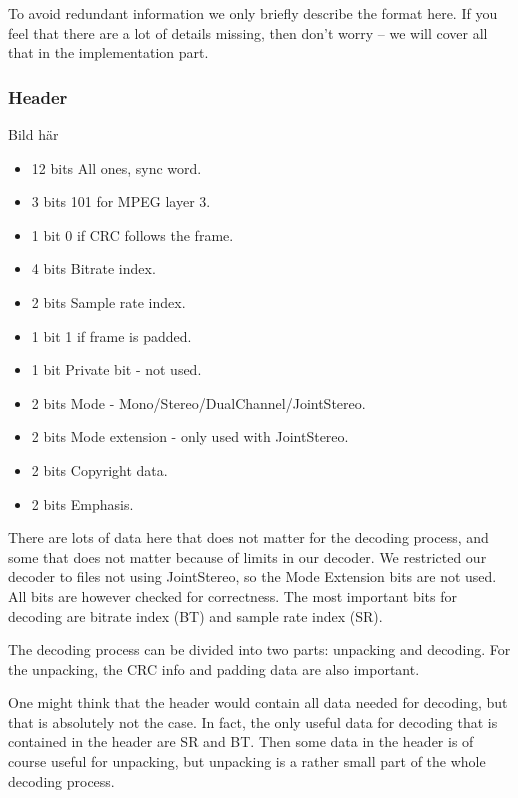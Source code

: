 \documentclass[a4paper,12pt]{article}
\begin{document}
       To avoid redundant information we only briefly describe the format here.
       If you feel that there are a lot of details missing, then don't worry --
       we will cover all that in the implementation part.

       \subsubsection{Header}
       \label{sec:header}
            Bild här \\
            \begin{itemize}
                \item{12 bits} All ones, sync word.
                \item{3 bits} 101 for MPEG layer 3.
                \item{1 bit} 0 if CRC follows the frame.
                \item{4 bits} Bitrate index.
                \item{2 bits} Sample rate index.
                \item{1 bit} 1 if frame is padded.
                \item{1 bit} Private bit - not used.
                \item{2 bits} Mode - Mono/Stereo/DualChannel/JointStereo.
                \item{2 bits} Mode extension - only used with JointStereo.
                \item{2 bits} Copyright data.
                \item{2 bits} Emphasis.
            \end{itemize}

            There are lots of data here that does not matter for the decoding
            process, and some that does not matter because of limits in our
            decoder. We restricted our decoder to files not using JointStereo,
            so the Mode Extension bits are not used. All bits are however
            checked for correctness. The most important bits for decoding are
            bitrate index (BT) and sample rate index (SR).

            The decoding process can be divided into two parts: unpacking and
            decoding. For the unpacking, the CRC info and padding data are also
            important.

            One might think that the header would contain all data needed for
            decoding, but that is absolutely not the case. In fact, the only
            useful data for decoding that is contained in the header are SR and
            BT. Then some data in the header is of course useful for unpacking,
            but unpacking is a rather small part of the whole decoding process.
\end{document}
